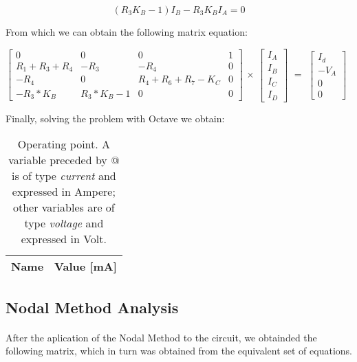\begin{equation}
	(R_3 K_B - 1) I_B - R_3 K_B I_A = 0
	\label{eq:3}
\end{equation}

From which we can obtain the following matrix equation:


$
\begin{bmatrix}
	0 & 0 & 0 & 1 \\
	R_1 + R_3 + R_4 &  -R_3 & - R_4 & 0 \\
	-R_4 & 0 & R_4 + R_6 + R_7 - K_C & 0 \\
	-R_3 * K_B & R_3 * K_B - 1 & 0 & 0
\end{bmatrix}
$
$\times$
$
\begin{bmatrix}
	I_A \\
	I_B \\
	I_C \\
	I_D
\end{bmatrix}
$
$=$
$
\begin{bmatrix}
	I_d \\
	-V_A \\
	0 \\
	0
	\label{m:1}
\end{bmatrix}
$


Finally, solving the problem with Octave we obtain:

\begin{table}[h]
  \centering
  \begin{tabular}{|l|r|}
    \hline    
    {\bf Name} & {\bf Value [mA]} \\ \hline
    
  \end{tabular}
  \caption{Operating point. A variable preceded by @ is of type {\em current}
    and expressed in Ampere; other variables are of type {\it voltage} and expressed in
    Volt.}
  \label{tab:op}
\end{table}

\subsection{Nodal Method Analysis}

\paragraph{} After the aplication of the Nodal Method to the circuit, we obtainded the following matrix, which in turn was obtained from the equivalent set of equations.


